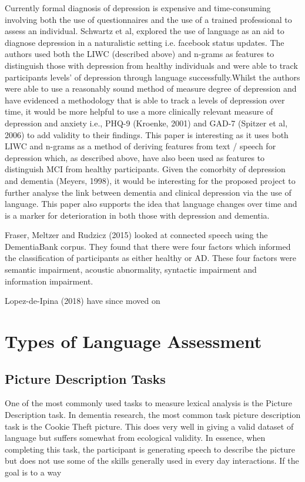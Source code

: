 \documentclass[a4paper]{article}
\begin{document}
\par
Currently formal diagnosis of depression is expensive and time-consuming involving both the use of questionnaires and the use of a trained professional to assess an individual. Schwartz et al, explored the use of language as an aid to diagnose depression in a naturalistic setting i.e. facebook status updates. The authors used both the LIWC (described above) and n-grams as features to distinguish those with depression from healthy individuals and were able to track participants levels' of depression through language successfully.Whilst the authors were able to use a reasonably sound method of measure degree of depression and have evidenced a methodology that is able to track a levels of depression over time, it would be more helpful to use a more clinically relevant measure of depression and anxiety i.e., PHQ-9 (Kroenke, 2001) and GAD-7 (Spitzer et al, 2006) to add validity to their findings. This paper is interesting as it uses both LIWC and n-grams as a method of deriving features from text / speech for depression which, as described above, have also been used as features to distinguish MCI from healthy participants. Given the comorbity of depression and dementia (Meyers, 1998), it would be interesting for the proposed project to further analyse the link between dementia and clinical depression via the use of language. This paper also supports the idea that language changes over time and is a marker for deterioration in both those with depression and dementia. \newline
\par
Fraser, Meltzer and Rudzicz (2015) looked at connected speech using the DementiaBank corpus. They found that there were four factors which informed the classification of participants as either healthy or AD. These four factors were semantic impairment, acoustic abnormality, syntactic impairment and information impairment.\newline
\par
Lopez-de-Ipina (2018) have since moved on 
\section {Types of Language Assessment}
\subsection{Picture Description Tasks}
One of the most commonly used tasks to measure lexical analysis is the Picture Description task. In dementia research, the most common task picture description task is the Cookie Theft picture. This does very well in giving a valid dataset of language but suffers somewhat from ecological validity. In essence, when completing this task, the participant is generating speech to describe the picture but does not use some of the skills generally used in every day interactions. If the goal is to a way 
\end{document}
